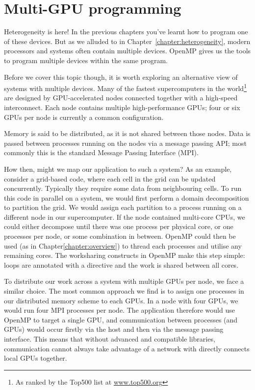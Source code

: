 
\def\ArtDir{06.Advanced/figures}

\chapter{Multi-GPU programming}
\label{chapter:multi_gpu}

Heterogeneity is here! In the previous chapters you've learnt how to program one
of these devices. But as we alluded to in Chapter~\ref{chapter:heterogeneity},
modern processors and systems often contain multiple devices. OpenMP gives us
the tools to program multiple devices within the same program.

Before we cover this topic though, it is worth exploring an alternative view of
systems with multiple devices. Many of the fastest supercomputers in the
world\footnote{As ranked by the Top500 list at \url{www.top500.org}} are
designed by GPU-accelerated nodes connected together with a high-speed
interconnect. Each node contains multiple high-performance GPUs; four or six
GPUs per node is currently a common configuration.

Memory is said to be distributed, as it is not shared between those nodes. Data
is passed between processes running on the nodes via a message passing API;
most commonly this is the standard Message Passing Interface (MPI).

How then, might we map our application to such a system? As an example, consider
a grid-based code, where each cell in the grid can be updated concurrently.
Typically they require some data from neighbouring cells.
To run this code in parallel on a system, we would first perform a domain
decomposition to partition the grid. We would assign each partition to a process
running on a different node in our supercomputer. If the node contained
multi-core CPUs, we could either decompose until there was one process per
physical core, or one processes per node, or some combination in between.
OpenMP could then be used (as in Chapter\ref{chapter:overview}) to thread each
processes and utilise any remaining cores. The worksharing constructs in OpenMP
make this step simple: loops are annotated with a  directive
and the work is shared between all cores.

To distribute our work across a system with multiple GPUs per node, we face a
similar choice. The most common approach we find is to assign one processes in
our distributed memory scheme to each GPUs. In a node with four GPUs, we would
run four MPI processes per node. The application therefore would use OpenMP to
target a single GPU, and communication between processes (and GPUs) would occur
firstly via the host and then via the message passing interface. This means that
without advanced and compatible libraries, communication cannot always take
advantage of a network with directly connects local GPUs together.

